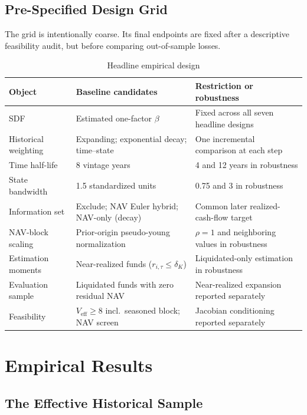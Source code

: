 \documentclass[11pt]{article}
\begin{document}
\subsection{Pre-Specified Design Grid}

The grid is intentionally coarse. Its final endpoints are fixed after a
descriptive feasibility audit, but before comparing out-of-sample losses.

\begin{table}[htbp]
\centering
\caption{Headline empirical design}
\label{tab:design}
\small
\begin{tabular}{p{}p{}p{}}
\toprule
Object & Baseline candidates & Restriction or robustness \\
\midrule
SDF & Estimated one-factor $\beta$
    & Fixed across all seven headline designs \\
Historical weighting & Expanding; exponential decay; time--state
    & One incremental comparison at each step \\
Time half-life & 8 vintage years
    & 4 and 12 years in robustness \\
State bandwidth & 1.5 standardized units
    & 0.75 and 3 in robustness \\
Information set & Exclude; NAV Euler hybrid; NAV-only (decay)
    & Common later realized-cash-flow target \\
NAV-block scaling & Prior-origin pseudo-young normalization
    & $\rho=1$ and neighboring values in robustness \\
Estimation moments & Near-realized funds ($r_{i,\tau}\leq\delta_K$)
    & Liquidated-only estimation in robustness \\
Evaluation sample & Liquidated funds with zero residual NAV
    & Near-realized expansion reported separately \\
Feasibility & $V_{\mathrm{eff}}\geq 8$ incl.\ seasoned block; NAV screen
    & Jacobian conditioning reported separately \\
\bottomrule
\end{tabular}
\end{table}

\section{Empirical Results}

\subsection{The Effective Historical Sample}
\end{document}
